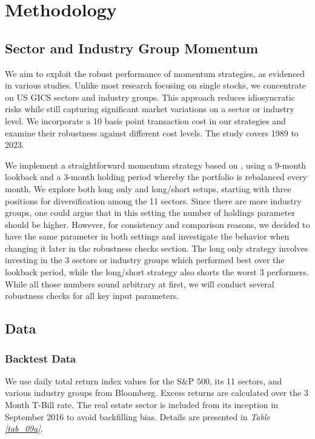 \documentclass[a4paper,12pt,twoside]{article}
\begin{document}
\newpage
\section{Methodology}
\subsection{Sector and Industry Group Momentum}
We aim to exploit the robust performance of momentum strategies, as evidenced in various studies. Unlike most research focusing on single stocks, we concentrate on US GICS sectors and industry groups. This approach reduces idiosyncratic risks while still capturing significant market variations on a sector or industry level. We incorporate a 10 basis point transaction cost in our strategies and examine their robustness against different cost levels. The study covers 1989 to 2023.

We implement a straightforward momentum strategy based on \cite{jegadeesh1993returns}, using a 9-month lookback and a 3-month holding period whereby the portfolio is rebalanced every month. We explore both long only and long/short setups, starting with three positions for diversification among the 11 sectors. Since there are more industry groups, one could argue that in this setting the number of holdings parameter should be higher. However, for consistency and comparison reasons, we decided to have the same parameter in both settings and investigate the behavior when changing it later in the robustness checks section. The long only strategy involves investing in the 3 sectors or industry groups which performed best over the lookback period, while the long/short strategy also shorts the worst 3 performers. While all those numbers sound arbitrary at first, we will conduct several robustness checks for all key input parameters.


\subsection{Data}
\subsubsection{Backtest Data}
We use daily total return index values for the S\&P 500, its 11 sectors, and various industry groups from Bloomberg. Excess returns are calculated over the 3 Month T-Bill rate. The real estate sector is included from its inception in September 2016 to avoid backfilling bias. Details are presented in \textit{Table \ref{tab_09a}}.
\end{document}
